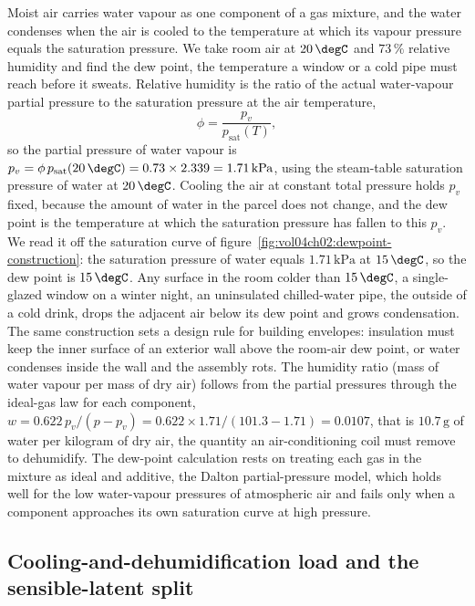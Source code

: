 Moist air carries water vapour as one component of a gas mixture, and the
water condenses when the air is cooled to the temperature at which its
vapour pressure equals the saturation pressure. We take room air at
$20\,\degC$ and $73\,\%$ relative humidity and find the dew point, the
temperature a window or a cold pipe must reach before it sweats. Relative
humidity is the ratio of the actual water-vapour partial pressure to the
saturation pressure at the air temperature,
\[
\phi = \frac{p_v}{p_{\text{sat}}(T)},
\]
so the partial pressure of water vapour is $p_v = \phi\,
p_{\text{sat}}(20\,\degC) = 0.73\times 2.339 = 1.71\,\text{kPa}$, using
the steam-table saturation pressure of water at $20\,\degC$. Cooling the
air at constant total pressure holds $p_v$ fixed, because the amount of
water in the parcel does not change, and the dew point is the
temperature at which the saturation pressure has fallen to this $p_v$. We
read it off the saturation curve of
figure~\ref{fig:vol04ch02:dewpoint-construction}: the saturation pressure
of water equals $1.71\,\text{kPa}$ at $15\,\degC$, so the dew point is
$15\,\degC$. Any surface in the room colder than $15\,\degC$, a
single-glazed window on a winter night, an uninsulated chilled-water
pipe, the outside of a cold drink, drops the adjacent air below its dew
point and grows condensation. The same construction sets a design rule
for building envelopes: insulation must keep the inner surface of an
exterior wall above the room-air dew point, or water condenses inside the
wall and the assembly rots. The humidity ratio (mass of water vapour per
mass of dry air) follows from the partial pressures through the ideal-gas
law for each component, $w = 0.622\,p_v/(p - p_v) = 0.622\times
1.71/(101.3 - 1.71) = 0.0107$, that is $10.7\,\text{g}$ of water per
kilogram of dry air, the quantity an air-conditioning coil must remove to
dehumidify. The dew-point calculation rests on treating each gas in the
mixture as ideal and additive, the Dalton partial-pressure model, which
holds well for the low water-vapour pressures of atmospheric air and
fails only when a component approaches its own saturation curve at high
pressure.



\subsection{Cooling-and-dehumidification load and the sensible-latent
split}

